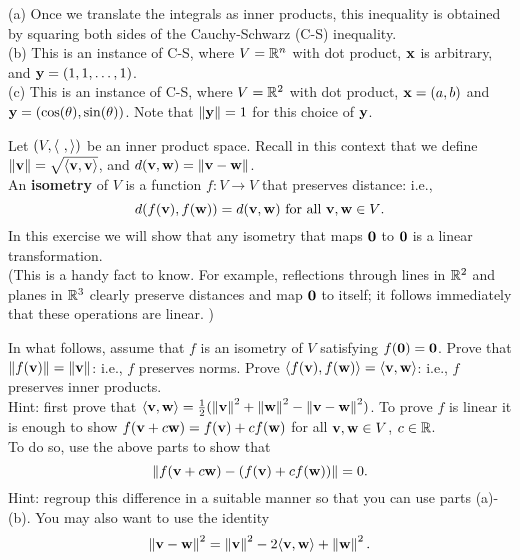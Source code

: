 \ee
\begin{solution}
\noindent 
(a) Once we translate the integrals as inner products, this inequality is obtained by squaring both sides of the Cauchy-Schwarz (C-S) inequality. 
\\
(b) This is an instance of C-S, where $V={\mathbb R}^n$ with dot product, ${\mathbf x}$ is arbitrary, and ${\mathbf y}=(1,1,\dots, 1)$. 
\\
(c) This is an instance of C-S, where $V={\mathbb R}^2$ with dot product, ${\mathbf x}=(a,b)$ and ${\mathbf y}=(\cos(\theta), \sin(\theta))$. Note that $\left\lVert{\mathbf y}\right\rVert=1$ for this choice of ${\mathbf y}$. 
\end{solution}
\begin{samepage}
\ii Let $(V,\langle  \ , \rangle)$ be an inner product space. Recall in this context that we define $\left\lVert{\mathbf v}\right\rVert=\sqrt{\langle {\mathbf v}, {\mathbf v}\rangle}$, and $d({\mathbf v}, {\mathbf w})=\left\lVert{\mathbf v}-{\mathbf w}\right\rVert$. 
\\
An {\bf isometry}  of $V$ is a function $f\colon V\rightarrow V$ that preserves distance: i.e., 
\[
d(f({\mathbf v}), f({\mathbf w}))=d({\mathbf v}, {\mathbf w}) \text{ for all ${\mathbf v}, {\mathbf w}\in V$}.
\]
In this exercise we will show that any isometry that maps ${\mathbf 0}$ to ${\mathbf 0}$ is a linear transformation. \\
(This is a handy fact to know. For example, reflections through lines in ${\mathbb R}^2$ and planes in ${\mathbb R}^3$ clearly preserve distances and map ${\mathbf 0}$ to itself; it follows immediately that these operations are linear. )

\noindent
In what follows, assume that $f$ is an isometry of $V$ satisfying $f({\mathbf 0})={\mathbf 0}$.  
\bb
\ii Prove that $\left\lVert f({\mathbf v})\right\rVert=\left\lVert{\mathbf v}\right\rVert$: i.e., $f$ preserves norms. 
\ii Prove $\langle f({\mathbf v}), f({\mathbf w})\rangle=\langle {\mathbf v}, {\mathbf w}\rangle$: i.e., $f$ preserves inner products. 
\\
Hint: first prove that $\langle {\mathbf v}, {\mathbf w}\rangle=\frac{1}{2}(\left\lVert{\mathbf v}\right\rVert^2+\left\lVert{\mathbf w}\right\rVert^2-\left\lVert{\mathbf v}-{\mathbf w}\right\rVert^2)$.
\ii To prove $f$ is linear it is enough to show $f({\mathbf v}+c{\mathbf w})=f({\mathbf v})+cf({\mathbf w})$ for all ${\mathbf v}, {\mathbf w}\in V$, $c\in {\mathbb R}$. \\
To do so, use the above parts to show that 
\[
\left\lVert f({\mathbf v}+c{\mathbf w})-(f({\mathbf v})+cf({\mathbf w}))\right\rVert=0.
\]  
\noindent
Hint: regroup this difference in a suitable manner so that you can use parts (a)-(b). You may also want to use the identity 
\[
\left\lVert{\mathbf v}-{\mathbf w}\right\rVert^2=\left\lVert{\mathbf v}\right\rVert^2-2\langle {\mathbf v},{\mathbf w}\rangle+\left\lVert{\mathbf w}\right\rVert^2.
\]
\ee
\end{samepage}
